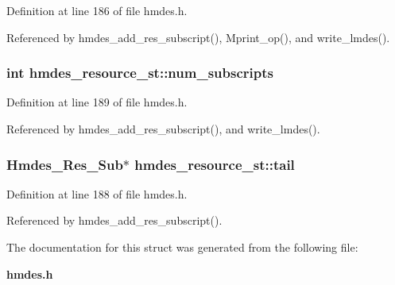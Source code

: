 Definition at line 186 of file hmdes.h.

Referenced by hmdes\_\-add\_\-res\_\-subscript(), Mprint\_\-op(), and write\_\-lmdes().
\subsubsection{\setlength{\rightskip}{0pt plus 5cm}int \bf{hmdes\_\-resource\_\-st::num\_\-subscripts}}\label{structhmdes__resource__st_a468252cf50f30516d4bc9559b7104b5}




Definition at line 189 of file hmdes.h.

Referenced by hmdes\_\-add\_\-res\_\-subscript(), and write\_\-lmdes().
\subsubsection{\setlength{\rightskip}{0pt plus 5cm}\bf{Hmdes\_\-Res\_\-Sub}$\ast$ \bf{hmdes\_\-resource\_\-st::tail}}\label{structhmdes__resource__st_e13670032d513a830e67f6d307d1c106}




Definition at line 188 of file hmdes.h.

Referenced by hmdes\_\-add\_\-res\_\-subscript().

The documentation for this struct was generated from the following file:\begin{CompactItemize}
\item 
\bf{hmdes.h}\end{CompactItemize}
